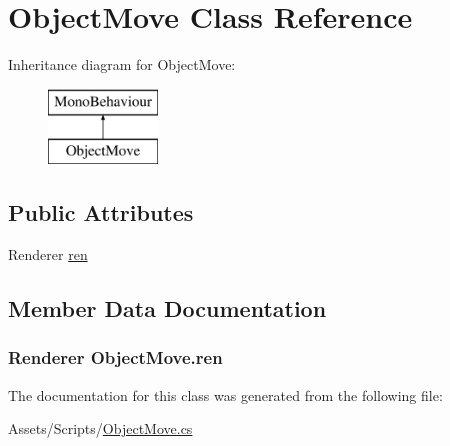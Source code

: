 \hypertarget{class_object_move}{}\section{Object\+Move Class Reference}
\label{class_object_move}
Inheritance diagram for Object\+Move\+:\begin{figure}[H]
\begin{center}
\leavevmode
\includegraphics[height=2.000000cm]{class_object_move}
\end{center}
\end{figure}
\subsection*{Public Attributes}
\begin{DoxyCompactItemize}
\item 
Renderer \hyperlink{class_object_move_a7dfb8fd3e835fa77a8f4dfe8092ab026}{ren}
\end{DoxyCompactItemize}


\subsection{Member Data Documentation}
\hypertarget{class_object_move_a7dfb8fd3e835fa77a8f4dfe8092ab026}{}
\subsubsection[{ren}]{\setlength{\rightskip}{0pt plus 5cm}Renderer Object\+Move.\+ren}\label{class_object_move_a7dfb8fd3e835fa77a8f4dfe8092ab026}


The documentation for this class was generated from the following file\+:\begin{DoxyCompactItemize}
\item 
Assets/\+Scripts/\hyperlink{_object_move_8cs}{Object\+Move.\+cs}\end{DoxyCompactItemize}
